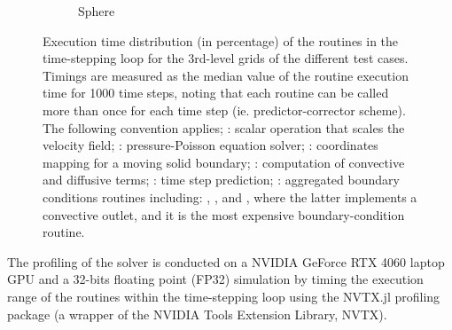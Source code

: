 \documentclass[10pt,a4paper]{article}
\begin{document}
\begin{figure}[!t]
\begin{subfigure}[t]{0.32\linewidth}
    \caption{Sphere\hspace*{2em}}
  \end{subfigure}
  \begin{subfigure}[t]{0.325\linewidth}
    \centering
  \end{subfigure}
  \caption{Execution time distribution (in percentage) of the routines in the time-stepping loop for the 3rd-level grids of the different test cases. Timings are measured as the median value of the routine execution time for 1000 time steps, noting that each routine can be called more than once for each time step (ie. predictor-corrector scheme). The following convention applies; : scalar operation that scales the velocity field; : pressure-Poisson equation solver; : coordinates mapping for a moving solid boundary; : computation of convective and diffusive terms; : time step prediction; : aggregated boundary conditions routines including: , , and , where the latter implements a convective outlet, and it is the most expensive boundary-condition routine.}
\label{fig:profiling}
\end{figure}

The profiling of the solver is conducted on a NVIDIA GeForce RTX 4060 laptop GPU and a 32-bits floating point (FP32) simulation by timing the execution range of the routines within the time-stepping loop using the NVTX.jl profiling package \citep{Byrne2023} (a wrapper of the NVIDIA Tools Extension Library, NVTX). 
\end{document}

